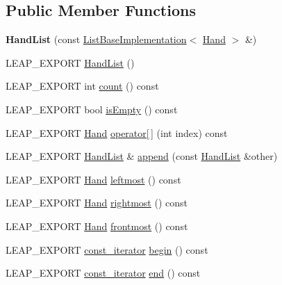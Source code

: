 \subsection*{Public Member Functions}
\begin{DoxyCompactItemize}
\item 
\hypertarget{class_leap_1_1_hand_list_a5f0e45c94fcbb0e43395732142bd7bb1}{{\bfseries Hand\+List} (const \hyperlink{class_leap_1_1_list_base_implementation}{List\+Base\+Implementation}$<$ \hyperlink{class_leap_1_1_hand}{Hand} $>$ \&)}\label{class_leap_1_1_hand_list_a5f0e45c94fcbb0e43395732142bd7bb1}

\item 
L\+E\+A\+P\+\_\+\+E\+X\+P\+O\+R\+T \hyperlink{class_leap_1_1_hand_list_a98b159b1e306e8ae0da3d99ae1eba8d3}{Hand\+List} ()
\item 
L\+E\+A\+P\+\_\+\+E\+X\+P\+O\+R\+T int \hyperlink{class_leap_1_1_hand_list_a295c831f0f081b171c24b5c58cf7caf0}{count} () const 
\item 
L\+E\+A\+P\+\_\+\+E\+X\+P\+O\+R\+T bool \hyperlink{class_leap_1_1_hand_list_adb6551505d5ac31fa927a4b4d81108c5}{is\+Empty} () const 
\item 
L\+E\+A\+P\+\_\+\+E\+X\+P\+O\+R\+T \hyperlink{class_leap_1_1_hand}{Hand} \hyperlink{class_leap_1_1_hand_list_ad5831967b9e61cfe4abbeba476ca5462}{operator\mbox{[}$\,$\mbox{]}} (int index) const 
\item 
L\+E\+A\+P\+\_\+\+E\+X\+P\+O\+R\+T \hyperlink{class_leap_1_1_hand_list}{Hand\+List} \& \hyperlink{class_leap_1_1_hand_list_a7715a0e0df3e513c6cb1869691ef982d}{append} (const \hyperlink{class_leap_1_1_hand_list}{Hand\+List} \&other)
\item 
L\+E\+A\+P\+\_\+\+E\+X\+P\+O\+R\+T \hyperlink{class_leap_1_1_hand}{Hand} \hyperlink{class_leap_1_1_hand_list_a3ba586cd7485eeafde9d685753138b52}{leftmost} () const 
\item 
L\+E\+A\+P\+\_\+\+E\+X\+P\+O\+R\+T \hyperlink{class_leap_1_1_hand}{Hand} \hyperlink{class_leap_1_1_hand_list_a7123132de1d18b883a4344b38001ddc5}{rightmost} () const 
\item 
L\+E\+A\+P\+\_\+\+E\+X\+P\+O\+R\+T \hyperlink{class_leap_1_1_hand}{Hand} \hyperlink{class_leap_1_1_hand_list_ade694cc02f04254d32421d77d8bdc45c}{frontmost} () const 
\item 
L\+E\+A\+P\+\_\+\+E\+X\+P\+O\+R\+T \hyperlink{class_leap_1_1_hand_list_a9c35a4db8fd94a3b1a029efecbd13668}{const\+\_\+iterator} \hyperlink{class_leap_1_1_hand_list_ac3d04f28abd474e576df5c34a6c972e0}{begin} () const 
\item 
L\+E\+A\+P\+\_\+\+E\+X\+P\+O\+R\+T \hyperlink{class_leap_1_1_hand_list_a9c35a4db8fd94a3b1a029efecbd13668}{const\+\_\+iterator} \hyperlink{class_leap_1_1_hand_list_a227637f8beefa00d76745b30aac7c82f}{end} () const 
\end{DoxyCompactItemize}
